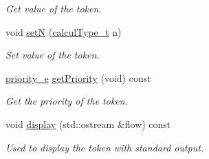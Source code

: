 \begin{DoxyCompactItemize}
\begin{DoxyCompactList}\small\item\em Get value of the token. \end{DoxyCompactList}\item 
\hypertarget{class_token_af3149fcdb502bbd0c4813b50ad898e2a}{}void \hyperlink{class_token_af3149fcdb502bbd0c4813b50ad898e2a}{set\+N} (\hyperlink{mpfr_interface_8h_a16492006127cd422340be2441c22c14b}{calcul\+Type\+\_\+t} n)\label{class_token_af3149fcdb502bbd0c4813b50ad898e2a}

\begin{DoxyCompactList}\small\item\em Set value of the token. \end{DoxyCompactList}\item 
\hypertarget{class_token_a87c0015a5a932014b9de9fa0441988ea}{}\hyperlink{token_8h_add90230972b81fc8809dc185a06a9b2a}{priority\+\_\+e} \hyperlink{class_token_a87c0015a5a932014b9de9fa0441988ea}{get\+Priority} (void) const \label{class_token_a87c0015a5a932014b9de9fa0441988ea}

\begin{DoxyCompactList}\small\item\em Get the priority of the token. \end{DoxyCompactList}\item 
\hypertarget{class_token_a04cb002bc8a1ca11487fa254a4455bf9}{}void \hyperlink{class_token_a04cb002bc8a1ca11487fa254a4455bf9}{display} (std\+::ostream \&flow) const \label{class_token_a04cb002bc8a1ca11487fa254a4455bf9}

\begin{DoxyCompactList}\small\item\em Used to display the token with standard output. \end{DoxyCompactList}\end{DoxyCompactItemize}
